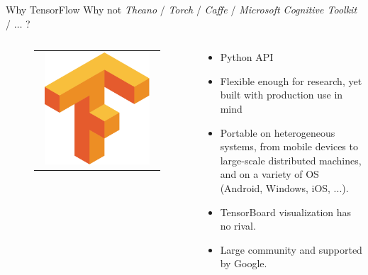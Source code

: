\documentclass[aspectratio=169]{beamer}
\begin{document}

\begin{frame}{Why TensorFlow}
Why not \textit{Theano} / \textit{Torch} / \textit{Caffe} / \textit{Microsoft Cognitive Toolkit} / $\dots$ ?\\
\vspace{0.5cm}
\begin{columns}
\begin{column}{0.3\textwidth}
\begin{figure}
\begin{tabular}{c}
	\includegraphics[width=0.9\textwidth]{img/tf/tf_logo.png}
\end{tabular}
\end{figure}
\end{column}
\begin{column}{0.7\textwidth}
	\begin{itemize}
	\item Python API
	\item Flexible enough for research, yet built with production use in mind
	\item Portable on heterogeneous systems, from mobile devices to large-scale distributed machines, and on a variety of OS (Android, Windows, iOS, ...).
	\item TensorBoard visualization has no rival.
	\item Large community and supported by Google.
	\end{itemize}
\end{column}
\end{columns}
\end{frame}
\end{document}
